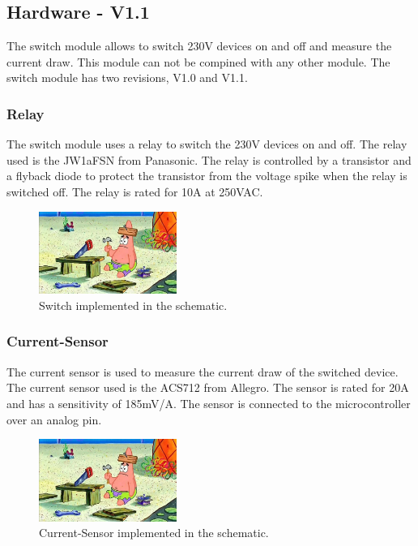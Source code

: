 \subsection{Hardware - V1.1}

    The switch module allows to switch 230V devices on and off and measure the current draw. 
    This module can not be compined with any other module. The switch module has two revisions,
    V1.0 and V1.1.

    \subsubsection{Relay}
        The switch module uses a relay to switch the 230V devices on and off. The relay used is 
        the JW1aFSN from Panasonic. The relay is controlled by a transistor and a flyback diode
        to protect the transistor from the voltage spike when the relay is switched off. The relay
        is rated for 10A at 250VAC.

        \begin{figure}[H]
            \centering
            \includegraphics[width=0.4\textwidth]{assets/HW/TBD.png}
            \caption{Switch implemented in the schematic.}
        \end{figure}
    
    \subsubsection{Current-Sensor}

        The current sensor is used to measure the current draw of the switched device. The current
        sensor used is the ACS712 from Allegro. The sensor is rated for 20A and has a sensitivity of 
        185mV/A. The sensor is connected to the microcontroller over an analog pin. 

        \begin{figure}[H]
            \centering
            \includegraphics[width=0.4\textwidth]{assets/HW/TBD.png}
            \caption{Current-Sensor implemented in the schematic.}
        \end{figure}